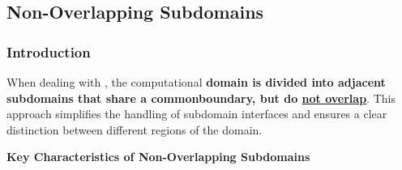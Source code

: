 \subsection{Non-Overlapping Subdomains}

\subsubsection{Introduction}

When dealing with , the computational \textbf{domain is divided into adjacent subdomains that share a common\break boundary, but do \underline{not overlap}}. This approach simplifies the handling of subdomain interfaces and ensures a clear distinction between different regions of the domain.

\highspace
\begin{flushleft}
    \textcolor{Green3}{ \textbf{Key Characteristics of Non-Overlapping Subdomains}}
\end{flushleft}
